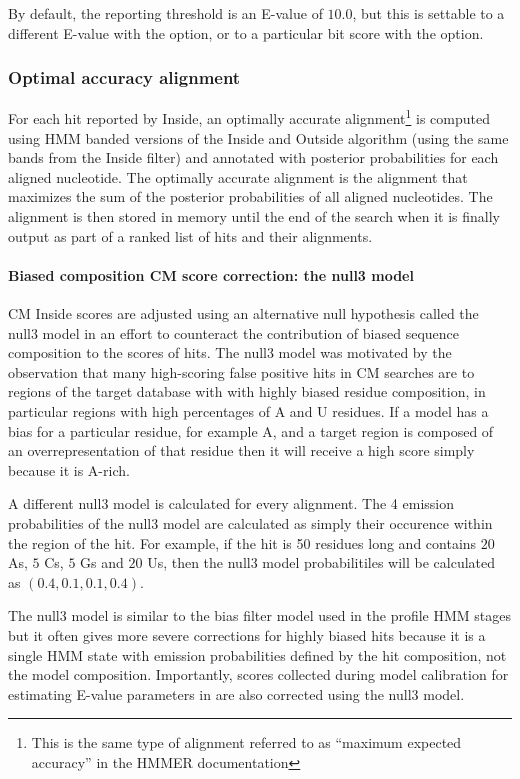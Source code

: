 \begin{sreoutput}
By default, the reporting threshold is an E-value of $10.0$, but this
is settable to a different E-value with the  option, or
to a particular bit score with the  option.

\subsubsection{Optimal accuracy alignment}

For each hit reported by Inside, an optimally accurate
alignment\footnote{This is the same type of alignment referred to as
``maximum expected accuracy'' in the HMMER documentation} is computed
using HMM banded versions of the Inside and Outside algorithm (using
the same bands from the Inside filter) and annotated with posterior
probabilities for each aligned nucleotide. The optimally accurate
alignment is the alignment that maximizes the sum of the posterior
probabilities of all aligned nucleotides. The alignment is then stored in
memory until the end of the search when it is finally output as part
of a ranked list of hits and their alignments.

\paragraph{Biased composition CM score correction: the null3 model}

CM Inside scores are adjusted using an alternative null hypothesis
called the null3 model in an effort to counteract the contribution of
biased sequence composition to the scores of hits. The null3 model
was motivated by the observation that many high-scoring false positive
hits in CM searches are to regions of the target database with with
highly biased residue composition, in particular regions with high
percentages of A and U residues.  If a model has a bias for a
particular residue, for example A, and a target region is composed of
an overrepresentation of that residue then it will receive a high
score simply because it is A-rich.

A different null3 model is calculated for every alignment. The 4
emission probabilities of the null3 model are calculated as 
simply their occurence within the region of the hit. For example, if
the hit is 50 residues long and contains $20$ As, $5$ Cs, $5$ Gs and $20$ Us,
then the null3 model probabilitiles will be calculated as $(0.4, 0.1,
0.1, 0.4)$. 

The null3 model is similar to the bias filter model used in the
profile HMM stages but it often gives more severe corrections for
highly biased hits because it is a single HMM state with emission
probabilities defined by the hit composition, not the model
composition. Importantly, scores collected during model calibration
for estimating E-value parameters in  are also
corrected using the null3 model.


\end{sreoutput}
